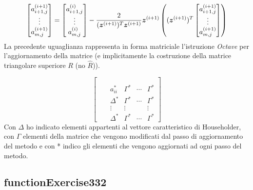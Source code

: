 \begin{oss}
\begin{displaymath}
\begin{bmatrix}
a_{i+1, j}^{(i+1)} \\
\vdots \\
a_{m, j}^{(i+1)}
\end{bmatrix} = 
\begin{bmatrix}
a_{i+1, j}^{(i)} \\
\vdots \\
a_{m, j}^{(i)}
\end{bmatrix} - \frac{2}{(\vect{z}^{(i+1)})^{T} \vect{z}^{(i+1)}} %
\vect{z}^{(i+1)} %
\left ( (\vect{z}^{(i+1)})^{T} \begin{bmatrix}
a_{i+1, j}^{(i+1)} \\
\vdots \\
a_{m, j}^{(i+1)} 
\end{bmatrix} \right )
\end{displaymath}
La precedente uguaglianza rappresenta in forma matriciale l'istruzione
\emph{Octave} per l'aggiornamento della matrice (e implicitamente la
costruzione della matrice triangolare superiore $R$ (no $\hat{R}$)).
\end{oss}

\begin{oss}
\begin{displaymath}
\left [
\begin{array}{cccccc}
\\
\\
& & a_{ii}^{*} & \Gamma^{*} & \cdots & \Gamma^{*}   
	 \\ & & \Delta^{*} & \Gamma^{*} & \cdots & \Gamma^{*}
	 \\ & & \vdots & \vdots &  & \vdots
	 \\ & & \Delta^{*} & \Gamma^{*} & \cdots & \Gamma^{*}
\end{array}
\right ]
\end{displaymath}
Con $\Delta$ ho indicato elementi appartenti al vettore caratteristico di
Householder, con $\Gamma$ elementi della matrice che vengono modificati dal
passo di aggiornamento del metodo e con * indico gli elementi che vengono
aggiornati ad ogni passo del metodo.
\end{oss}




\subsection{functionExercise332}
\label{subsection:functionExercise332}
